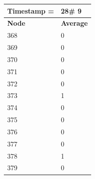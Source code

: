 \begin{tabular}{|l||l|}
\hline
\textbf{Timestamp =} & \textbf{28}\# 9\\\hline
	\textbf{Node} & \textbf{Average} \\ \hline
\hline
	368 & 0 \\ \hline
	369 & 0 \\ \hline
	370 & 0 \\ \hline
	371 & 0 \\ \hline
	372 & 0 \\ \hline
	373 & 1 \\ \hline
	374 & 0 \\ \hline
	375 & 0 \\ \hline
	376 & 0 \\ \hline
	377 & 0 \\ \hline
	378 & 1 \\ \hline
	379 & 0 \\ \hline
\end{tabular}

